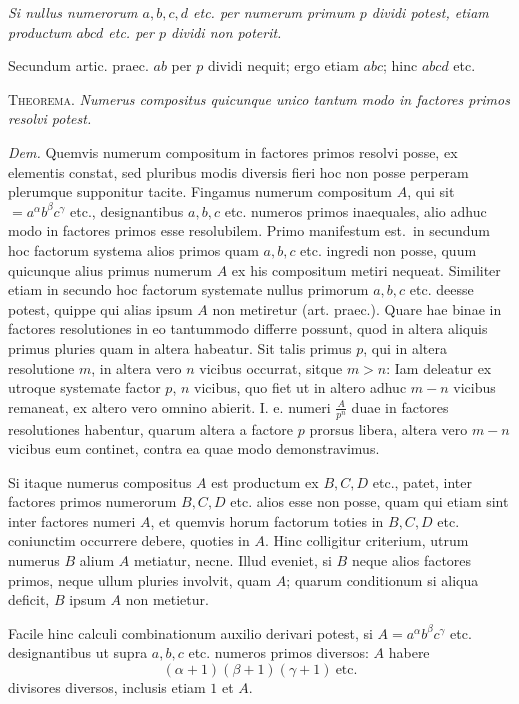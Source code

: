 \emph{Si nullus numerorum $a, b, c, d$ etc. per numerum primum $p$ dividi potest, etiam productum $abcd$ etc. per $p$ dividi non poterit.}

Secundum artic. praec. $ab$ per $p$ dividi nequit; ergo etiam $abc$; hinc $abcd$ etc.

\textsc{Theorema}. \emph{Numerus compositus quicunque unico tantum modo in factores primos resolvi potest.}

\emph{Dem.} Quemvis numerum compositum in factores primos resolvi posse, ex elementis constat, sed pluribus modis diversis fieri hoc non posse perperam plerumque supponitur tacite. Fingamus numerum compositum $A$, qui sit $=a^\alpha b^\beta c^\gamma$ etc., designantibus $a, b, c$ etc. numeros primos inaequales, alio adhuc modo in factores primos esse resolubilem. Primo manifestum est.\ in secundum hoc factorum systema alios primos quam $a, b, c$ etc. ingredi non posse, quum quicunque alius primus numerum $A$ ex his compositum metiri nequeat. Similiter etiam in secundo hoc factorum systemate nullus primorum $a, b, c$ etc. deesse potest, quippe qui alias ipsum $A$ non metiretur (art. praec.). Quare hae binae in factores resolutiones in eo tantummodo differre possunt, quod in altera aliquis primus pluries quam in altera habeatur. Sit talis primus $p$, qui in altera resolutione $m$, in altera vero $n$ vicibus occurrat, sitque $m>n$: Iam deleatur ex utroque systemate factor $p$, $n$ vicibus, quo fiet ut in altero adhuc $m-n$ vicibus remaneat, ex altero vero omnino abierit. I. e. numeri $\frac{A}{p^n}$ duae in factores resolutiones habentur, quarum altera a factore $p$ prorsus libera, altera vero $m-n$ vicibus eum continet, contra ea quae modo demonstravimus.

Si itaque numerus compositus $A$ est productum ex $B, C, D$ etc., patet, inter factores primos numerorum $B, C, D$ etc. alios esse non posse, quam qui etiam sint inter factores numeri $A$, et quemvis horum factorum toties in $B, C, D$ etc. coniunctim occurrere debere, quoties in $A$. Hinc colligitur criterium, utrum numerus $B$ alium $A$ metiatur, necne. Illud eveniet, si $B$ neque alios factores primos, neque ullum pluries involvit, quam $A$; quarum conditionum si aliqua deficit, $B$ ipsum $A$ non metietur.

Facile hinc calculi combinationum auxilio derivari potest, si $A=a^\alpha b^\beta c^\gamma$ etc. designantibus ut supra $a, b, c$ etc. numeros primos diversos: $A$ habere
\[
(\alpha+1)(\beta+1)(\gamma+1)\ \mathrm{etc.}
\]
divisores diversos, inclusis etiam $1$ et $A$.

